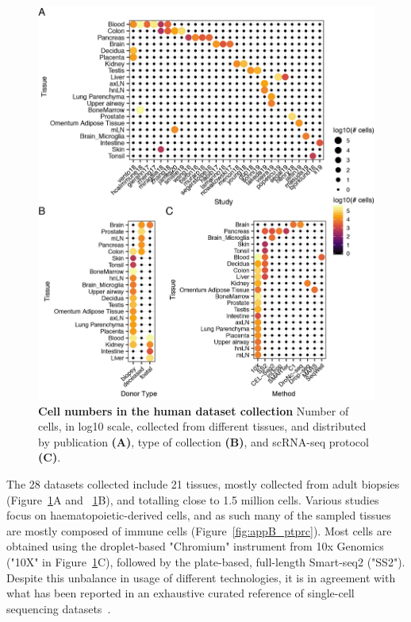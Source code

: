 \begin{figure}[ht!]
    \centering    
    \includegraphics[width=1.0\textwidth]{Chapter4/Figs/chap4_countsHumanAtlas.png} %
    \caption[Cell numbers in the human dataset collection]{\textbf{Cell numbers in the human dataset collection} \newline Number of cells, in log10 scale, collected from different tissues, and distributed by publication \textbf{(A)}, type of collection \textbf{(B)}, and scRNA-seq protocol \textbf{(C)}.}
    \label{fig:chap4_cha}
\end{figure}

The 28 datasets collected include 21 tissues, mostly collected from adult biopsies (Figure~\ref{fig:chap4_cha}A and ~\ref{fig:chap4_cha}B), and totalling close to 1.5 million cells. Various studies focus on haematopoietic-derived cells, and as such many of the sampled tissues are mostly composed of immune cells (Figure~\ref{fig:appB_ptprc}). Most cells are obtained using the droplet-based "Chromium" instrument from 10x Genomics ("10X" in Figure~\ref{fig:chap4_cha}C), followed by the plate-based, full-length Smart-seq2 ("SS2"). Despite this unbalance in usage of different technologies, it is in agreement with what has been reported in an exhaustive curated reference of single-cell sequencing datasets~\citep{svensson_curated_2019}.

